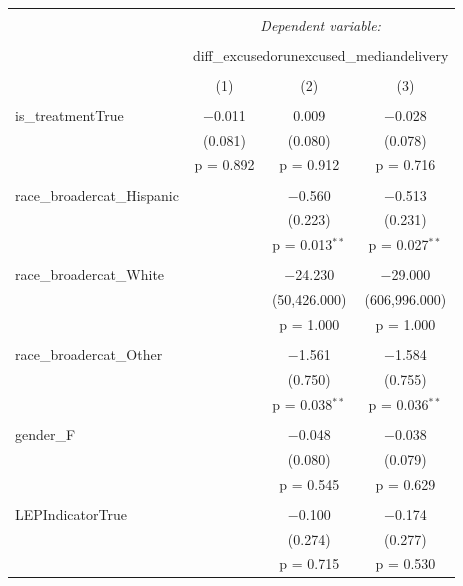 
\begin{table}[!htbp] \centering 
  \caption{} 
  \label{} 
\begin{tabular}{@{\extracolsep{5pt}}lccc} 
\\[-1.8ex]\hline 
\hline \\[-1.8ex] 
 & \multicolumn{3}{c}{\textit{Dependent variable:}} \\ 
\cline{2-4} 
\\[-1.8ex] & \multicolumn{3}{c}{diff\_excusedorunexcused\_mediandelivery} \\ 
\\[-1.8ex] & (1) & (2) & (3)\\ 
\hline \\[-1.8ex] 
 is\_treatmentTrue & $-$0.011 & 0.009 & $-$0.028 \\ 
  & (0.081) & (0.080) & (0.078) \\ 
  & p = 0.892 & p = 0.912 & p = 0.716 \\ 
  & & & \\ 
 race\_broadercat\_Hispanic &  & $-$0.560 & $-$0.513 \\ 
  &  & (0.223) & (0.231) \\ 
  &  & p = 0.013$^{**}$ & p = 0.027$^{**}$ \\ 
  & & & \\ 
 race\_broadercat\_White &  & $-$24.230 & $-$29.000 \\ 
  &  & (50,426.000) & (606,996.000) \\ 
  &  & p = 1.000 & p = 1.000 \\ 
  & & & \\ 
 race\_broadercat\_Other &  & $-$1.561 & $-$1.584 \\ 
  &  & (0.750) & (0.755) \\ 
  &  & p = 0.038$^{**}$ & p = 0.036$^{**}$ \\ 
  & & & \\ 
 gender\_F &  & $-$0.048 & $-$0.038 \\ 
  &  & (0.080) & (0.079) \\ 
  &  & p = 0.545 & p = 0.629 \\ 
  & & & \\ 
 LEPIndicatorTrue &  & $-$0.100 & $-$0.174 \\ 
  &  & (0.274) & (0.277) \\ 
  &  & p = 0.715 & p = 0.530 \\ 

\end{tabular}
\end{table}
